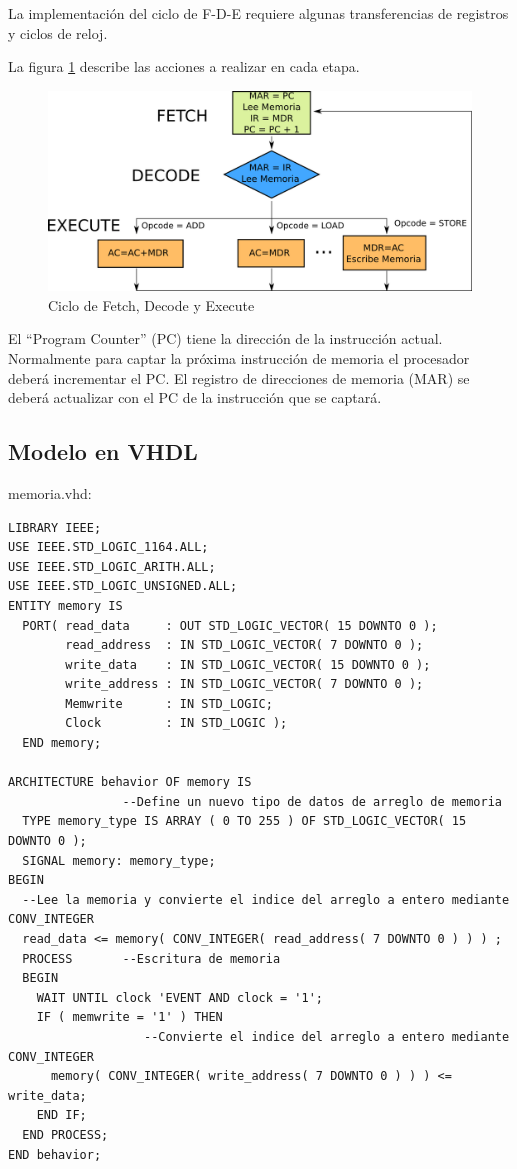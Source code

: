La implementación del ciclo de F-D-E requiere algunas transferencias de registros y ciclos de reloj.

La figura \ref{fde} describe las acciones a realizar en cada etapa.

\begin{figure}[h]
  \centering
    \includegraphics[width=1\textwidth]{graficos/fde.png}
  \caption{Ciclo de Fetch, Decode y Execute}
  \label{fde}
\end{figure} 

El ``Program Counter'' (PC) tiene la dirección de la instrucción actual. Normalmente para captar la próxima
instrucción de memoria el procesador deberá incrementar el PC. 
El registro de direcciones de memoria (MAR) se deberá actualizar con el PC de la instrucción que se captará.

\subsection{Modelo en VHDL}

memoria.vhd:
\begin{lstlisting}[style=vhdl, basicstyle=\footnotesize\ttfamily]
LIBRARY IEEE;
USE IEEE.STD_LOGIC_1164.ALL;
USE IEEE.STD_LOGIC_ARITH.ALL;
USE IEEE.STD_LOGIC_UNSIGNED.ALL;
ENTITY memory IS
  PORT( read_data     : OUT STD_LOGIC_VECTOR( 15 DOWNTO 0 );
        read_address  : IN STD_LOGIC_VECTOR( 7 DOWNTO 0 );
        write_data    : IN STD_LOGIC_VECTOR( 15 DOWNTO 0 ); 
        write_address : IN STD_LOGIC_VECTOR( 7 DOWNTO 0 );
        Memwrite      : IN STD_LOGIC;
        Clock         : IN STD_LOGIC );
  END memory;

ARCHITECTURE behavior OF memory IS
                --Define un nuevo tipo de datos de arreglo de memoria
  TYPE memory_type IS ARRAY ( 0 TO 255 ) OF STD_LOGIC_VECTOR( 15 DOWNTO 0 );
  SIGNAL memory: memory_type;
BEGIN
  --Lee la memoria y convierte el indice del arreglo a entero mediante CONV_INTEGER
  read_data <= memory( CONV_INTEGER( read_address( 7 DOWNTO 0 ) ) ) ;
  PROCESS       --Escritura de memoria
  BEGIN
    WAIT UNTIL clock 'EVENT AND clock = '1';
    IF ( memwrite = '1' ) THEN
                   --Convierte el indice del arreglo a entero mediante CONV_INTEGER
      memory( CONV_INTEGER( write_address( 7 DOWNTO 0 ) ) ) <= write_data;
    END IF;
  END PROCESS;
END behavior;
\end{lstlisting}

